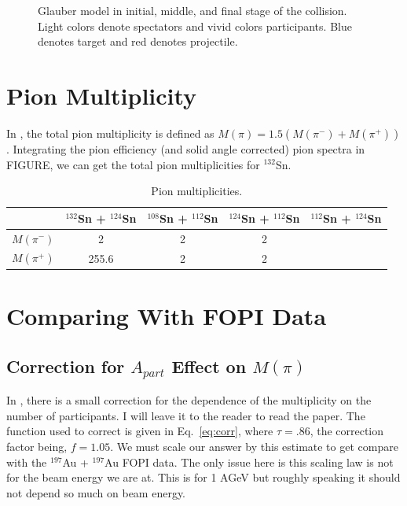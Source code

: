 \documentclass[12pt, letterpaper, twoside]{article}
\begin{document}
\begin{figure}[!hbt]
\begin{adjustbox}{max width=\linewidth,center}
\end{adjustbox}
\caption{Glauber model in initial, middle, and final stage of the collision. Light colors denote spectators and vivid colors participants. Blue denotes target and red denotes projectile.}
\label{fig:coll}

\end{figure}

\clearpage

\section{Pion Multiplicity}
In \cite{fopi}, the total pion multiplicity is defined as $M(\pi)=1.5(M(\pi^-)+M(\pi^+))$. Integrating the pion efficiency (and solid angle corrected) pion spectra in FIGURE, we can get the total pion multiplicities for ${}^{132}$Sn. 

\begin{table}[!htb]
\begin{center}
 \begin{tabular}{||c c c c c||}
 \hline
  & ${}^{132}$Sn + ${}^{124}$Sn & ${}^{108}$Sn + ${}^{112}$Sn & ${}^{124}$Sn + ${}^{112}$Sn & ${}^{112}$Sn + ${}^{124}$Sn\\ [0.5ex] 
 \hline\hline
  $M(\pi^-)$ & 2  & 2 & 2 & \\ [0.5ex]
 \hline\hline
 $M(\pi^+)$ &  255.6  &  2 & 2 & \\
 \hline
\end{tabular}
\end{center}
\caption{Pion multiplicities.}
\label{tb:pionmult}
\end{table}

\section{Comparing With FOPI Data}



\subsection{Correction for $A_{part}$ Effect on $M(\pi)$}
In \cite{fopi}, there is a small correction for the dependence of the multiplicity on the number of participants. I will leave it to the reader to read the paper. The function used to correct is given in Eq.~\ref{eq:corr}, where $\tau = .86$, the correction factor being, $f=1.05$. We must scale our answer by this estimate to get compare with the  ${}^{197}$Au + ${}^{197}$Au FOPI data. The only issue here is this scaling law is not for the beam energy we are at. This is for 1 AGeV but roughly speaking it should not depend so much on beam energy. 
\end{document}
